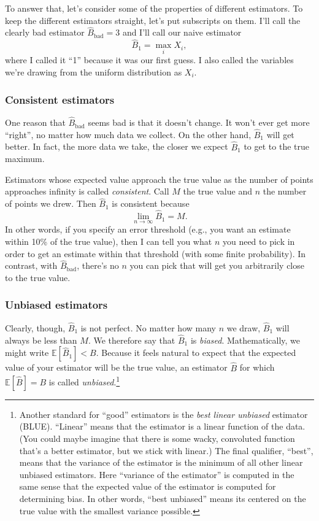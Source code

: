 \documentclass{book}
\begin{document}
To answer that, let's consider some of the properties of different
estimators. To keep the different estimators straight, let's put
subscripts on them. I'll call the clearly bad estimator
\(\hat{B}_\mathrm{bad} = 3\) and I'll call our naive estimator \[
\hat{B}_1 = \max_i X_i,
\] where I called it ``1'' because it was our first guess. I also called
the variables we're drawing from the uniform distribution as \(X_i\).

\subsubsection{Consistent estimators}\label{consistent-estimators}

One reason that \(\hat{B}_\mathrm{bad}\) seems bad is that it doesn't
change. It won't ever get more ``right'', no matter how much data we
collect. On the other hand, \(\hat{B}_1\) will get better. In fact, the
more data we take, the closer we expect \(\hat{B}_1\) to get to the true
maximum.

Estimators whose expected value approach the true value as the number of
points approaches infinity is called \emph{consistent}. Call \(M\) the
true value and \(n\) the number of points we drew. Then \(\hat{B}_1\) is
consistent because \[
\lim_{n \to \infty} \hat{B}_1 = M.
\] In other words, if you specify an error threshold (e.g., you want an
estimate within 10\% of the true value), then I can tell you what \(n\)
you need to pick in order to get an estimate within that threshold (with
some finite probability). In contrast, with \(\hat{B}_\mathrm{bad}\),
there's no \(n\) you can pick that will get you arbitrarily close to the
true value.

\subsubsection{Unbiased estimators}\label{unbiased-estimators}

Clearly, though, \(\hat{B}_1\) is not perfect. No matter how many \(n\)
we draw, \(\hat{B}_1\) will always be less than \(M\). We therefore say
that \(\hat{B}_1\) is \emph{biased}. Mathematically, we might write
\(\mathbb{E}[\hat{B}_1] < B\). Because it feels natural to expect that
the expected value of your estimator will be the true value, an
estimator \(\hat{B}\) for which \(\mathbb{E}[\hat{B}] = B\) is called
\emph{unbiased}.\footnote{Another standard for ``good'' estimators is
  the \emph{best linear unbiased} estimator (BLUE). ``Linear'' means
  that the estimator is a linear function of the data. (You could maybe
  imagine that there is some wacky, convoluted function that's a better
  estimator, but we stick with linear.) The final qualifier, ``best'',
  means that the variance of the estimator is the minimum of all other
  linear unbiased estimators. Here ``variance of the estimator'' is
  computed in the same sense that the expected value of the estimator is
  computed for determining bias. In other words, ``best unbiased'' means
  its centered on the true value with the smallest variance possible.}
\end{document}
